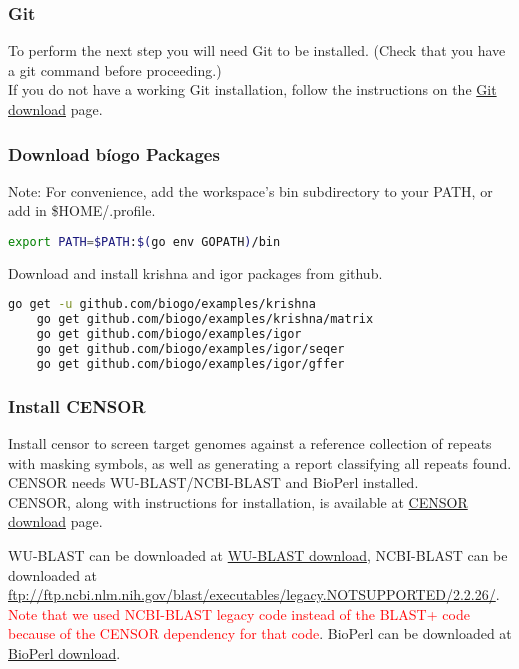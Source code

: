 \documentclass[a4paper,12pt]{article}
\begin{document}
	\subsubsection{Git}
	To perform the next step you will need Git to be installed. (Check that you have a git command before proceeding.) \\
	
	\noindent If you do not have a working Git installation, follow the instructions on the \href{https://git-scm.com/downloads}{\color{blue}Git download} page.
	
	\subsubsection{Download b\'iogo Packages}
	{\color{red} Note:}  For convenience, add the workspace's bin subdirectory to your PATH, or add in \$HOME/.profile. 
	\begin{lstlisting}[language=bash]
	export PATH=$PATH:$(go env GOPATH)/bin \end{lstlisting}
	\noindent Download and install krishna and igor packages from github. 
	
	\begin{lstlisting}[language=bash, columns=flexible]
	go get -u github.com/biogo/examples/krishna
	go get github.com/biogo/examples/krishna/matrix
	go get github.com/biogo/examples/igor
	go get github.com/biogo/examples/igor/seqer
	go get github.com/biogo/examples/igor/gffer \end{lstlisting}
	
	\subsubsection{ Install CENSOR}
	Install censor to screen target genomes against a reference collection of repeats with masking symbols, as well as generating a report classifying all repeats found. CENSOR needs WU-BLAST/NCBI-BLAST and BioPerl installed.\\
	
	\noindent CENSOR, along with instructions for installation, is available at \href{http://www.girinst.org/downloads/software/censor/} {\color{blue}CENSOR download} page.
	
	\noindent WU-BLAST can be downloaded at \href{https://www.advbiocomp.com/blast/obsolete/}{\color{blue}WU-BLAST download}, NCBI-BLAST can be downloaded at \url{ftp://ftp.ncbi.nlm.nih.gov/blast/executables/legacy.NOTSUPPORTED/2.2.26/}. 
	\textcolor{red}{Note that we used NCBI-BLAST legacy code instead of the BLAST+ code because of the CENSOR dependency for that code}.  
	BioPerl can be downloaded at \href{http://bioperl.org/INSTALL.html}{\color{blue}BioPerl download}.
\end{document}
